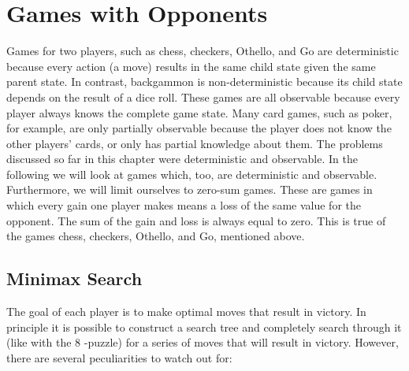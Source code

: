 \documentclass[10pt]{book}
\begin{document}
\section{Games with Opponents}
Games for two players, such as chess, checkers, Othello, and Go are deterministic because every action (a move) results in the same child state given the same parent state. In contrast, backgammon is non-deterministic because its child state depends on the result of a dice roll. These games are all observable because every player always knows the complete game state. Many card games, such as poker, for example, are only partially observable because the player does not know the other players' cards, or only has partial knowledge about them.
The problems discussed so far in this chapter were deterministic and observable. In the following we will look at games which, too, are deterministic and observable. Furthermore, we will limit ourselves to zero-sum games. These are games in which every gain one player makes means a loss of the same value for the opponent. The sum of the gain and loss is always equal to zero. This is true of the games chess, checkers, Othello, and Go, mentioned above.

\subsection{Minimax Search}
The goal of each player is to make optimal moves that result in victory. In principle it is possible to construct a search tree and completely search through it (like with the 8 -puzzle) for a series of moves that will result in victory. However, there are several peculiarities to watch out for:
\end{document}
